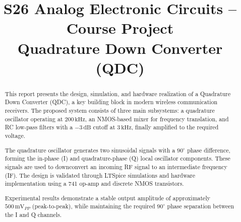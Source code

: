 \documentclass[conference]{IEEEtran}
\begin{document}
\title{S26 Analog Electronic Circuits -- Course Project\\
{\large Quadrature Down Converter (QDC)}}

\author{
    \and
    \and
}

\maketitle

\begin{abstract}
This report presents the design, simulation, and hardware realization of a Quadrature Down Converter (QDC), a key building block in modern wireless communication receivers. The proposed system consists of three main subsystems: a quadrature oscillator operating at $200\,\text{kHz}$, an NMOS-based mixer for frequency translation, and RC low-pass filters with a $-3\,\text{dB}$ cutoff at $3\,\text{kHz}$, finally amplified to the required voltage. 

The quadrature oscillator generates two sinusoidal signals with a $90^\circ$ phase difference, forming the in-phase (I) and quadrature-phase (Q) local oscillator components. These signals are used to downconvert an incoming RF signal to an intermediate frequency (IF). The design is validated through LTSpice simulations and hardware implementation using a 741 op-amp and discrete NMOS transistors. 

Experimental results demonstrate a stable output amplitude of approximately $500\,\text{mV}_{PP}$ (peak-to-peak), while maintaining the required $90^\circ$ phase separation between the I and Q channels.
\end{abstract}
\end{document}

